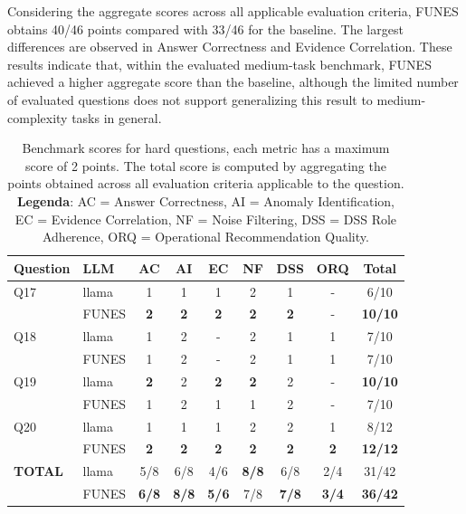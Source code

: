 Considering the aggregate scores across all applicable evaluation criteria, FUNES obtains 40/46 points compared with 33/46 for the baseline. The largest differences are observed in Answer Correctness and Evidence Correlation. These results indicate that, within the evaluated medium-task benchmark, FUNES achieved a higher aggregate score than the baseline, although the limited number of evaluated questions does not support generalizing this result to medium-complexity tasks in general.




\begin{table}[htbp]
\centering
\caption{Benchmark scores for hard questions, each metric has a maximum score of 2 points. The total score is computed by aggregating the points obtained across all evaluation criteria applicable to the question. \textbf{Legenda}: AC = Answer Correctness, AI = Anomaly Identification, EC = Evidence Correlation, NF = Noise Filtering, DSS = DSS Role Adherence, ORQ = Operational Recommendation Quality.}
\label{tab: hard_question_results}
\begin{tabular}{llccccccc}
\toprule
\textbf{Question} & \textbf{LLM} & \textbf{AC} & \textbf{AI} & \textbf{EC} & \textbf{NF} & \textbf{DSS} & \textbf{ORQ} & \textbf{Total} \\
\midrule
Q17 & llama & 1 & 1 & 1 & 2 & 1 & - & 6/10 \\
   & FUNES & \textbf{2} & \textbf{2} & \textbf{2} & \textbf{2} & \textbf{2} & - & \textbf{10/10} \\
\hline
Q18 & llama & 1 & 2 & - & 2 & 1 & 1 & 7/10 \\
   & FUNES & 1 & 2 & - & 2 & 1 & 1 & 7/10 \\
\hline
Q19 & llama & \textbf{2} & 2 & \textbf{2} & \textbf{2} & 2 & - & \textbf{10/10} \\
   & FUNES & 1 & 2 & 1 & 1 & 2 & - & 7/10 \\
\hline
Q20 & llama & 1 & 1 & 1 & 2 & 2 & 1 & 8/12 \\
   & FUNES & \textbf{2} & \textbf{2} & \textbf{2} & \textbf{2} & \textbf{2} & \textbf{2} & \textbf{12/12} \\
\midrule
\midrule
\textbf{TOTAL} & llama & 5/8 & 6/8 & 4/6 & \textbf{8/8} & 6/8 & 2/4 & 31/42 \\
                & FUNES & \textbf{6/8} & \textbf{8/8} & \textbf{5/6} & 7/8 & \textbf{7/8} & \textbf{3/4} & \textbf{36/42} \\
\bottomrule
\end{tabular}
\end{table}

